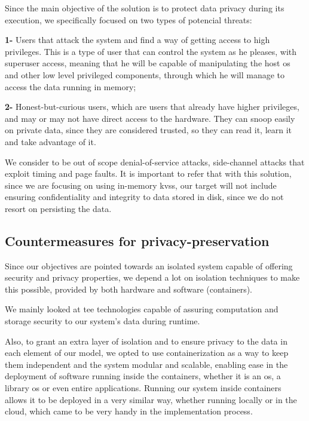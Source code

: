 Since the main objective of the solution is to protect data privacy during its execution, we specifically focused on two types of potencial threats: 

\textbf{1-} Users that attack the system and find a way of getting access to high privileges. This is a type of user that can control the system as he pleases, with superuser access, meaning that he will be capable of manipulating the host \gls{os} and other low level privileged components, through which he will manage to access the data running in memory;

\textbf{2-}  Honest-but-curious users, which are users that already have higher privileges, and may or may not have direct access to the hardware. They can snoop easily on private data, since they are considered trusted, so they can read it, learn it and take advantage of it.

We consider to be out of scope denial-of-service attacks, side-channel attacks that exploit timing and page faults.
It is important to refer that with this solution, since we are focusing on using in-memory \gls{kvs}s, our target will not include ensuring confidentiality and integrity to data stored in disk, since we do not resort on persisting the data.

\subsection{Countermeasures for privacy-preservation}

Since our objectives are pointed towards an isolated system capable of offering security
and privacy properties, we depend a lot on isolation techniques to make this possible,
provided by both hardware and software (containers).

We mainly looked at \gls{tee} technologies capable of assuring computation and storage security to our system's data during runtime. 

Also, to grant an extra layer of isolation and to ensure privacy to the data in each element of our model, we opted to use containerization as a way to keep them independent and the system modular and scalable, enabling ease in the deployment of software running inside the containers, whether it is an \gls{os}, a library
\gls{os} or even entire applications. Running our system inside containers allows it to be deployed in a very similar way, whether running locally or in the cloud, which came to be very handy in the implementation process. 





